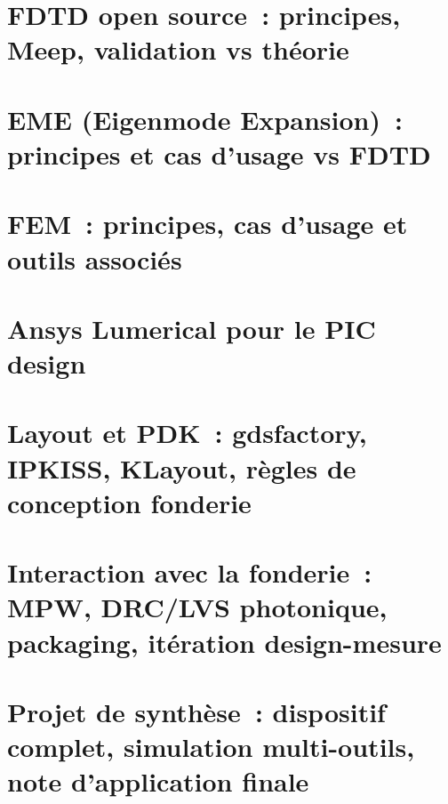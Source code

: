 \documentclass[11pt,twoside,openright]{book}
\begin{document}
\part{FDTD open source~: principes, Meep, validation vs théorie}
\label{part:module1}


\part{EME (Eigenmode Expansion)~: principes et cas d'usage vs FDTD}
\label{part:module2}


\part{FEM~: principes, cas d'usage et outils associés}
\label{part:module3}


\part{Ansys Lumerical pour le PIC design}
\label{part:module4}


\part{Layout et PDK~: gdsfactory, IPKISS, KLayout, règles de conception fonderie}
\label{part:module5}


\part{Interaction avec la fonderie~: MPW, DRC/LVS photonique, packaging, itération design-mesure}
\label{part:module6}


\part{Projet de synthèse~: dispositif complet, simulation multi-outils, note d'application finale}
\label{part:module7}

\end{document}
